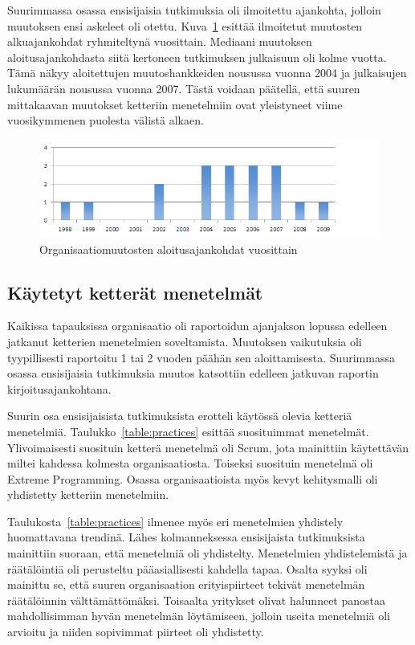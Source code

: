 Suurimmassa osassa ensisijaisia tutkimuksia oli ilmoitettu ajankohta, jolloin
muutoksen ensi askeleet oli otettu. Kuva~\ref{fig:start_year} esittää ilmoitetut
muutosten alkuajankohdat ryhmiteltynä vuosittain. Mediaani muutoksen
aloitusajankohdasta siitä kertoneen tutkimuksen julkaisuun oli kolme vuotta.
Tämä näkyy aloitettujen muutoshankkeiden nousussa vuonna 2004 ja julkaisujen
lukumäärän nousussa vuonna 2007. Tästä voidaan päätellä, että suuren mittakaavan
muutokset ketteriin menetelmiin ovat yleistyneet viime vuosikymmenen puolesta
välistä alkaen.

\begin{figure}[htb]
  \begin{center}
    \includegraphics[width=1\textwidth]{img/Transformation_start}
    \caption{Organisaatiomuutosten aloitusajankohdat vuosittain}
    \label{fig:start_year}
  \end{center}
\end{figure}

\subsection{Käytetyt ketterät menetelmät}

Kaikissa tapauksissa organisaatio oli raportoidun ajanjakson lopussa edelleen
jatkanut ketterien menetelmien soveltamista. Muutoksen vaikutuksia oli
tyypillisesti raportoitu 1 tai 2 vuoden päähän sen aloittamisesta. Suurimmassa
osassa ensisijaisia tutkimuksia muutos katsottiin edelleen jatkuvan raportin
kirjoitusajankohtana.

Suurin osa ensisijaisista tutkimuksista erotteli käytössä olevia ketteriä
menetelmiä. Taulukko~\ref{table:practices} esittää suosituimmat menetelmät.
Ylivoimaisesti suosituin ketterä menetelmä oli Scrum, jota mainittiin
käytettävän miltei kahdessa kolmesta organisaatiosta. Toiseksi suosituin
menetelmä oli Extreme Programming. Osassa organisaatioista myös kevyt
kehitysmalli oli yhdistetty ketteriin menetelmiin.

Taulukosta~\ref{table:practices} ilmenee myös eri menetelmien yhdistely
huomattavana trendinä. Lähes kolmanneksessa ensisijaista tutkimuksista
mainittiin suoraan, että menetelmiä oli yhdistelty. Menetelmien yhdistelemistä
ja räätälöintiä oli perusteltu pääasiallisesti kahdella tapaa. Osalta syyksi oli
mainittu se, että suuren organisaation erityispiirteet tekivät menetelmän
räätälöinnin välttämättömäksi. Toisaalta yritykset olivat halunneet panostaa
mahdollisimman hyvän menetelmän löytämiseen, jolloin useita menetelmiä oli
arvioitu ja niiden sopivimmat piirteet oli yhdistetty.

